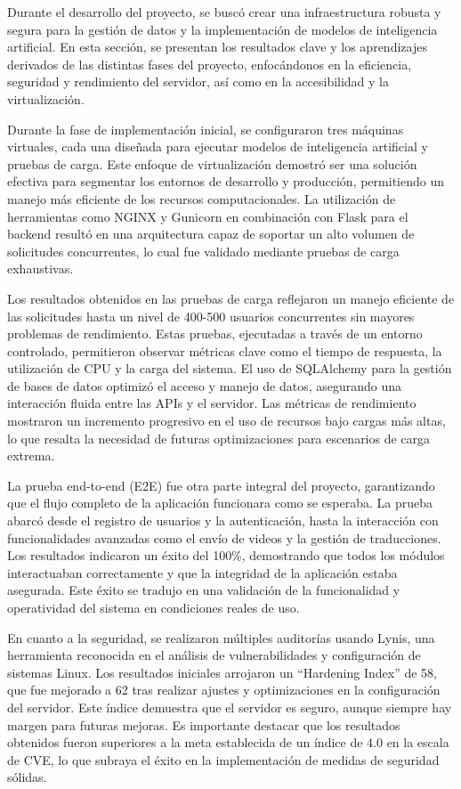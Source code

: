 Durante el desarrollo del proyecto, se buscó crear una infraestructura robusta y segura para la gestión de datos y la implementación de modelos de inteligencia artificial. En esta sección, se presentan los resultados clave y los aprendizajes derivados de las distintas fases del proyecto, enfocándonos en la eficiencia, seguridad y rendimiento del servidor, así como en la accesibilidad y la virtualización.

Durante la fase de implementación inicial, se configuraron tres máquinas virtuales, cada una diseñada para ejecutar modelos de inteligencia artificial y pruebas de carga. Este enfoque de virtualización demostró ser una solución efectiva para segmentar los entornos de desarrollo y producción, permitiendo un manejo más eficiente de los recursos computacionales. La utilización de herramientas como NGINX y Gunicorn en combinación con Flask para el backend resultó en una arquitectura capaz de soportar un alto volumen de solicitudes concurrentes, lo cual fue validado mediante pruebas de carga exhaustivas.

Los resultados obtenidos en las pruebas de carga reflejaron un manejo eficiente de las solicitudes hasta un nivel de 400-500 usuarios concurrentes sin mayores problemas de rendimiento. Estas pruebas, ejecutadas a través de un entorno controlado, permitieron observar métricas clave como el tiempo de respuesta, la utilización de CPU y la carga del sistema. El uso de SQLAlchemy para la gestión de bases de datos optimizó el acceso y manejo de datos, asegurando una interacción fluida entre las APIs y el servidor. Las métricas de rendimiento mostraron un incremento progresivo en el uso de recursos bajo cargas más altas, lo que resalta la necesidad de futuras optimizaciones para escenarios de carga extrema.

La prueba end-to-end (E2E) fue otra parte integral del proyecto, garantizando que el flujo completo de la aplicación funcionara como se esperaba. La prueba abarcó desde el registro de usuarios y la autenticación, hasta la interacción con funcionalidades avanzadas como el envío de videos y la gestión de traducciones. Los resultados indicaron un éxito del 100\%, demostrando que todos los módulos interactuaban correctamente y que la integridad de la aplicación estaba asegurada. Este éxito se tradujo en una validación de la funcionalidad y operatividad del sistema en condiciones reales de uso.

En cuanto a la seguridad, se realizaron múltiples auditorías usando Lynis, una herramienta reconocida en el análisis de vulnerabilidades y configuración de sistemas Linux. Los resultados iniciales arrojaron un ``Hardening Index'' de 58, que fue mejorado a 62 tras realizar ajustes y optimizaciones en la configuración del servidor. Este índice demuestra que el servidor es seguro, aunque siempre hay margen para futuras mejoras. Es importante destacar que los resultados obtenidos fueron superiores a la meta establecida de un índice de 4.0 en la escala de CVE, lo que subraya el éxito en la implementación de medidas de seguridad sólidas.

